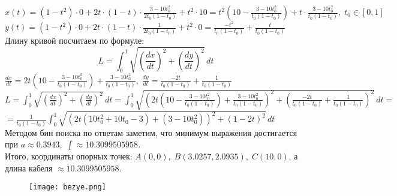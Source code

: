 \noindent \(x(t) = (1-t^2)\cdot 0 + 2t\cdot(1-t)\cdot\frac{3-10t_0^2}{2t_0(1-t_0)}+t^2\cdot10 = t^2\left(10 - \frac{3-10t_0^2}{t_0(1-t_0)} \right) + t\cdot\frac{3-10t_0^2}{t_0(1-t_0)}, \; t_0 \in [0, 1]\)  \\
\(y(t) = (1-t^2)\cdot 0 + 2t\cdot(1-t)\cdot\frac{1}{2t_0(1-t_0)}+t^2\cdot0 = \frac{-t^2}{t_0(1-t_0)} + \frac{t}{t_0(1-t_0)}\) \\

\noindent Длину кривой посчитаем по формуле: \\
\[L = \int_0^1 \sqrt{\left( \frac{dx}{dt} \right)^2 + \left( \frac{dy}{dt} \right)^2} \, dt\]
\(\displaystyle \frac{dx}{dt} = 2t\left(10 - \frac{3-10t_0^2}{t_0(1-t_0)}\right) + \frac{3-10t_0^2}{t_0(1-t_0)}, \; \frac{dy}{dt} = \frac{-2t}{t_0(1-t_0)} + \frac{1}{t_0(1-t_0)}\) \\
\(\displaystyle L = \int_0^1 \sqrt{\left( \frac{dx}{dt} \right)^2 + \left( \frac{dy}{dt} \right) ^2} \, dt =  \int_0^1 \sqrt{\left(2t\left(10 - \frac{3-10t_0^2}{t_0(1-t_0)}\right) + \frac{3-10t_0^2}{t_0(1-t_0)}\right)^2 + \left(\frac{-2t}{t_0(1-t_0)} + \frac{1}{t_0(1-t_0)} \right)^2} \, dt = \) \\
\(\displaystyle=\frac{1}{t_0(1 - t_0)} \int_0^1 \sqrt{\left(2t(10t_0^2 + 10t_0 - 3) + (3 - 10t_0^2)\right)^2 + (1 - 2t)^2} \, dt\) \\
Методом бин поиска по ответам заметим, что минимум выражения достигается при $a \approx 0.3943, \; \displaystyle \int \approx 10.3099505958$. \\

\noindent Итого, координаты опорных точек: \(A(0, 0), \; B(3.0257, 2.0935), \; C(10, 0)\), а длина кабеля $ \approx 10.3099505958.$
\begin{figure}[H]
    \centering
    \texttt{[image: bezye.png]}
\end{figure}

